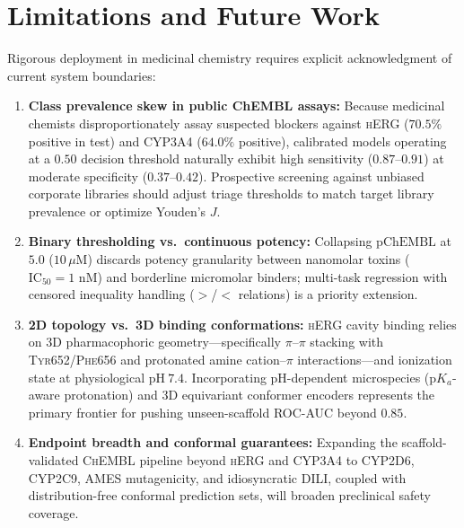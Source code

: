 \documentclass[10pt,twocolumn,letterpaper]{article}
\begin{document}
\section{Limitations and Future Work}
Rigorous deployment in medicinal chemistry requires explicit acknowledgment of current system boundaries:
\begin{enumerate}
  \item \textbf{Class prevalence skew in public ChEMBL assays:} Because medicinal chemists disproportionately assay suspected blockers against \textsc{hERG} ($70.5\%$ positive in test) and \textsc{CYP3A4} ($64.0\%$ positive), calibrated models operating at a $0.50$ decision threshold naturally exhibit high sensitivity ($0.87$–$0.91$) at moderate specificity ($0.37$–$0.42$). Prospective screening against unbiased corporate libraries should adjust triage thresholds to match target library prevalence or optimize Youden's $J$.
  \item \textbf{Binary thresholding vs.\ continuous potency:} Collapsing $\mathrm{pChEMBL}$ at $5.0$ ($10\,\mu\mathrm{M}$) discards potency granularity between nanomolar toxins ($\mathrm{IC}_{50} = 1\text{ nM}$) and borderline micromolar binders; multi-task regression with censored inequality handling ($>$/$<$ relations) is a priority extension.
  \item \textbf{2D topology vs.\ 3D binding conformations:} \textsc{hERG} cavity binding relies on 3D pharmacophoric geometry—specifically $\pi$–$\pi$ stacking with \textsc{Tyr652}/\textsc{Phe656} and protonated amine cation–$\pi$ interactions—and ionization state at physiological $\mathrm{pH}\ 7.4$. Incorporating pH-dependent microspecies ($\mathrm{p}K_a$-aware protonation) and 3D equivariant conformer encoders represents the primary frontier for pushing unseen-scaffold \textsc{ROC-AUC} beyond $0.85$.
  \item \textbf{Endpoint breadth and conformal guarantees:} Expanding the scaffold-validated \textsc{ChEMBL} pipeline beyond \textsc{hERG} and \textsc{CYP3A4} to \textsc{CYP2D6}, \textsc{CYP2C9}, \textsc{AMES} mutagenicity, and idiosyncratic \textsc{DILI}, coupled with distribution-free conformal prediction sets, will broaden preclinical safety coverage.
\end{enumerate}

\end{document}
